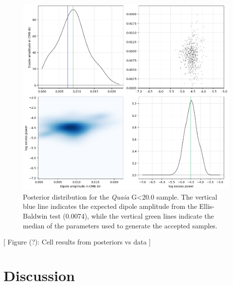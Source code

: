 \documentclass[modern]{aastex631}
\newcommand{\quaia}{\textsl{Quaia}\xspace}
\begin{document}
\begin{figure}
    \centering
    \includegraphics[width=0.9\linewidth]{images/catwise_ABC_posterior.png}
    \caption{Posterior distribution for the \quaia G<20.0 sample. The vertical blue line indicates the expected dipole amplitude from the Ellis-Baldwin test (0.0074), while the vertical green lines indicate the median of the parameters used to generate the accepted samples.}
    \label{fig:catwise_posterior}
\end{figure}

[ Figure (?): Cell results from posteriors vs data ]


\section{Discussion}
\label{sec:discussion}
\end{document}
